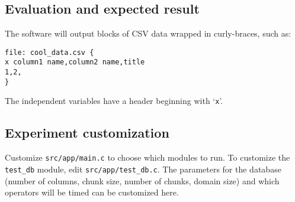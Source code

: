 \documentclass{IEEEtran}
\begin{document}
\subsection{Evaluation and expected result}

The software will output blocks of CSV data wrapped in curly-braces, such as:

\begin{verbatim}
file: cool_data.csv {
x column1 name,column2 name,title
1,2,
}
\end{verbatim}

The independent variables have a header beginning with `\texttt{x}'.

\subsection{Experiment customization}

Customize \texttt{src/app/main.c} to choose which modules to run. To customize the \texttt{test\_db} module, edit \texttt{src/app/test\_db.c}. The parameters for the database (number of columns, chunk size, number of chunks, domain size) and which operators will be timed can be customized here.
\end{document}
